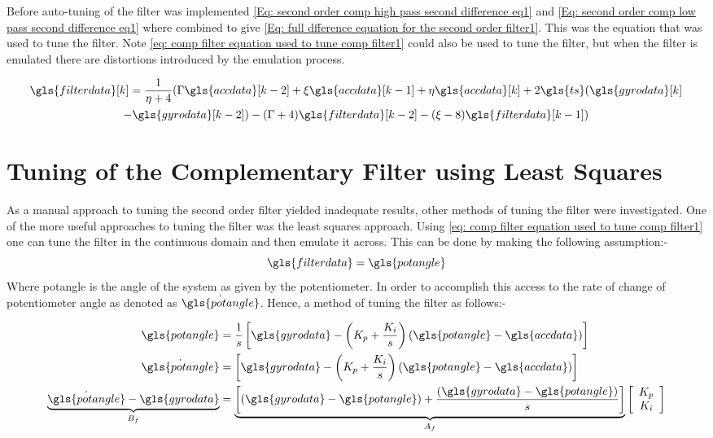 Before auto-tuning of the filter was implemented \eqref{Eq: second order comp high pass second difference eq1} and \eqref{Eq: second order comp low pass second difference eq1} where combined to give \eqref{Eq: full dfference equation for the second order filter1}. This was the equation that was used to tune the filter. Note \eqref{eq: comp filter equation used to tune comp filter1} could also be used to tune the filter, but when the filter is emulated there are distortions introduced by the emulation process.

\begin{multline}
	\gls{filterdata} [k] = \frac{1}{\eta +4}(\Gamma \gls{accdata} [k-2] + \xi \gls{accdata} [k-1] + \eta \gls{accdata} [k] + 2\gls{ts} ( \gls{gyrodata} [k] \\
	- \gls{gyrodata} [k -2] )   - (\Gamma + 4)\gls{filterdata} [k-2] - (\xi - 8) \gls{filterdata} [k - 1] ) \label{Eq: full dfference equation for the second order filter1}
\end{multline}

\section{Tuning of the Complementary Filter using Least Squares }
As a manual approach to tuning the second order filter yielded inadequate results, other methods of tuning the filter were investigated. One of the more useful approaches to tuning the filter was the least squares approach. Using \eqref{eq: comp filter equation used to tune comp filter1} one can tune the filter in the continuous domain and then emulate it across. This can be done by making the following assumption:-
\begin{equation}
	\gls{filterdata} = \gls{potangle}
\end{equation}
Where \gls{potangle} is the angle of the system as given by the potentiometer. In order to accomplish this  access to the rate of change of potentiometer angle as denoted as $\dot{\gls{potangle}}$. Hence, a method of tuning the filter as follows:-



\begin{align}
	\begin{split}
		\gls{potangle} &= \frac{1}{s}\left[ \gls{gyrodata} -\left(K_p + \frac{K_i}{s}\right) (\gls{potangle} - \gls{accdata})\right]\\
		\dot{\gls{potangle} }&= \left[ \gls{gyrodata} -\left(K_p + \frac{K_i}{s}\right) (\gls{potangle} - \gls{accdata})\right]\\
		\underbrace{\dot{\gls{potangle} } - \gls{gyrodata}}_{\text{$B_f$}}& = \underbrace{\left[(\gls{gyrodata} - \gls{potangle} ) + \frac{(\gls{gyrodata} - \gls{potangle} )}{s} \right] }_{\text{$A_f$}} \left[\begin{array}{c} K_p\\ K_i\end{array}\right] \label{eq: placer for leasr square eqaution1}
	\end{split}
\end{align}

